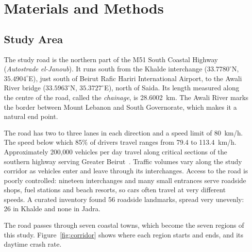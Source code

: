 \documentclass[11pt]{article}
\begin{document}
\section{Materials and Methods}

\subsection{Study Area}

The study road is the northern part of the M51 South Coastal Highway
(\emph{Autostrade el-Janoub}). It runs south from the Khalde interchange
($33.7780^{\circ}$N, $35.4904^{\circ}$E), just south of Beirut Rafic Hariri
International Airport, to the Awali River bridge ($33.5963^{\circ}$N,
$35.3727^{\circ}$E), north of Saida. Its length measured along the centre of
the road, called the \emph{chainage}, is 28.6002~km. The Awali River marks the
border between Mount Lebanon and South Governorate, which makes it a natural
end point.

The road has two to three lanes in each direction and a speed limit of 80~km/h.
The speed below which 85\% of drivers travel ranges from 79.4 to 113.4~km/h.
Approximately 200{,}000 vehicles per day travel along critical sections
of the southern highway serving Greater Beirut~\cite{worldbank2017}.
Traffic volumes vary along the study corridor as vehicles enter and
leave through its interchanges. Access to the road is poorly controlled: nineteen interchanges
and many small entrances serve roadside shops, fuel stations and beach resorts,
so cars often travel at very different speeds. A curated inventory found 56
roadside landmarks, spread very unevenly: 26 in Khalde and none in Jadra.

The road passes through seven coastal towns, which become the seven regions of
this study. Figure~\ref{fig:corridor} shows where each region starts and ends,
and its daytime crash rate.
\end{document}
